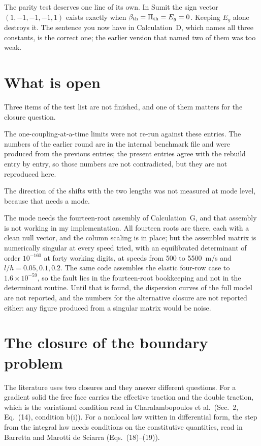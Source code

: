 \documentclass[11pt,a4paper]{article}
\begin{document}
The parity test deserves one line of its own. In Sumit the sign vector $(1,-1,-1,-1,1)$ exists
exactly when $\beta_{\rm th}=\Pi_{\rm th}=E_g=0$. Keeping $E_g$ alone destroys it. The sentence you
now have in Calculation~D, which names all three constants, is the correct one; the earlier version
that named two of them was too weak.

\section*{What is open}

Three items of the test list are not finished, and one of them matters for the closure question.

The one-coupling-at-a-time limits were not re-run against these entries. The numbers of the earlier
round are in the internal benchmark file and were produced from the previous entries; the present
entries agree with the rebuild entry by entry, so those numbers are not contradicted, but they are
not reproduced here.

The direction of the shifts with the two lengths was not measured at mode level, because that
needs a mode.

The mode needs the fourteen-root assembly of Calculation~G, and that assembly is not working in my
implementation. All fourteen roots are there, each with a clean null vector, and the column scaling
is in place; but the assembled matrix is numerically singular at every speed tried, with an
equilibrated determinant of order $10^{-160}$ at forty working digits, at speeds from 500 to
5500~m/s and $l/h=0.05,0.1,0.2$. The same code assembles the elastic four-row case to
$1.6\times10^{-59}$, so the fault lies in the fourteen-root bookkeeping and not in the determinant
routine. Until that is found, the dispersion curves of the full model are not reported, and the
numbers for the alternative closure are not reported either: any figure produced from a singular
matrix would be noise.

\section*{The closure of the boundary problem}

The literature uses two closures and they answer different questions. For a gradient solid the
free face carries the effective traction and the double traction, which is the variational
condition read in Charalambopoulos et al.\ (Sec.~2, Eq.~(14), condition b(i)). For a nonlocal law
written in differential form, the step from the integral law needs conditions on the constitutive
quantities, read in Barretta and Marotti de Sciarra (Eqs.~(18)--(19)).
\end{document}
